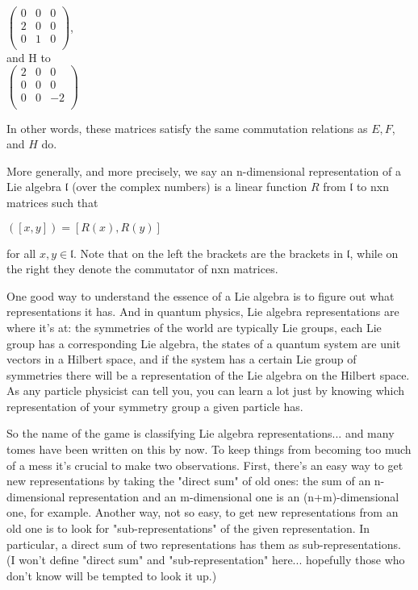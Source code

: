 \\
$\begin{pmatrix}
0 & 0 & 0 \\
2 & 0 & 0 \\
0 & 1 & 0 \\
\end{pmatrix}$,
\\

and H to
\\

$\begin{pmatrix}
2 & 0 & 0 \\  
0 & 0 & 0 \\
0 & 0 &-2\\
\end{pmatrix}$

In other words, these matrices satisfy the same commutation relations as $E,F$, and $H$ do.

More generally, and more precisely, we say an n-dimensional representation of a Lie algebra $\mathfrak{l}$ (over the complex numbers) is a linear function $R$ from $\mathfrak{l}$ to nxn matrices such that

$([x,y]) = [R(x),R(y)]$

for all $x,y \in \mathfrak{l}$. Note that on the left the brackets are the brackets in $\mathfrak{l}$, while on the right they denote the commutator of nxn matrices.

One good way to understand the essence of a Lie algebra is to figure out what representations it has. And in quantum physics, Lie algebra representations are where it's at: the symmetries of the world are typically Lie groups, each Lie group has a corresponding Lie algebra, the states of a quantum system are unit vectors in a Hilbert space, and if the system has a certain Lie group of symmetries there will be a representation of the Lie algebra on the Hilbert space. As any particle physicist can tell you, you can learn a lot just by knowing which representation of your symmetry group a given particle has.

So the name of the game is classifying Lie algebra representations... and many tomes have been written on this by now. To keep things from becoming too much of a mess it's crucial to make two observations. First, there's an easy way to get new representations by taking the "direct sum" of old ones: the sum of an n-dimensional representation and an m-dimensional one is an (n+m)-dimensional one, for example. Another way, not so easy, to get new representations from an old one is to look for "sub-representations" of the given representation. In particular, a direct sum of two representations has them as sub-representations. (I won't define "direct sum" and "sub-representation" here... hopefully those who don't know will be tempted to look it up.)

